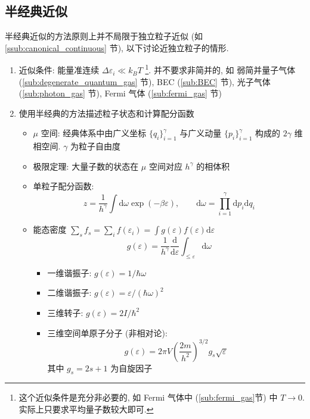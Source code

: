 \documentclass[12pt,a4paper]{article}%
\numberwithin{equation}{section}
\newcommand{\dif}{\mathrm{d}}
\begin{document}
\subsection{半经典近似} %
\label{sub:semi-classical_approx}
半经典近似的方法原则上并不局限于独立粒子近似 (如 \ref{ssub:canonical_continuous} 节), 以下讨论近独立粒子的情形.
\begin{enumerate}
    \item 近似条件: 能量准连续 $\Delta\varepsilon_i\ll k_B T$
    \footnote{这个近似条件是充分非必要的, 如 Fermi 气体中 (\ref{sub:fermi_gas}节) 中 $T\to 0$. 实际上只要求平均量子数较大即可.}. 
    并不要求非简并的, 如
    弱简并量子气体 (\ref{sub:degenerate_quantum_gas} 节), 
    BEC (\ref{sub:BEC} 节), 
    光子气体 (\ref{sub:photon_gas} 节), 
    Fermi 气体 (\ref{sub:fermi_gas} 节)
    \item 使用半经典的方法描述粒子状态和计算配分函数
    \begin{itemize}
        \item $\mu$ 空间: 经典体系中由广义坐标 $\{q_i\}_{i=1}^\gamma$ 与广义动量 $\{p_i\}_{i=1}^\gamma$ 构成的 $2\gamma$ 维相空间.
        $\gamma$ 为粒子自由度
        \item 极限定理: 大量子数的状态在 $\mu$ 空间对应 $h^\gamma$ 的相体积
        \item 单粒子配分函数: 
        \begin{equation}
            z = \frac 1{h^\gamma}\int\dif\omega\exp(-\beta\varepsilon),\qquad
            \dif\omega = \prod_{i=1}^\gamma \dif p_i\dif q_i
        \end{equation}
        \item 能态密度 $\sum_s f_s = \sum_i f(\varepsilon_i) = \int g(\varepsilon)f(\varepsilon)\dif\varepsilon$
        \begin{equation}
            g(\varepsilon) = \frac1{h^{\gamma}}\frac{\dif}{\dif\varepsilon}\int_{\le\varepsilon}\dif\omega
        \end{equation}
        \begin{itemize}
            \item 一维谐振子: $g(\varepsilon) = 1/\hbar\omega$
            \item 二维谐振子: $g(\varepsilon) = \varepsilon/(\hbar\omega)^2$
            \item 三维转子: $g(\varepsilon) = 2I/\hbar^2$
            \item 三维空间单原子分子 (非相对论): 
            \begin{equation}\label{equ:state_density_for_ideal_gas}
                g(\varepsilon) = 2\pi V\left(\frac{2m}{h^2}\right)^{3/2}g_s\sqrt\varepsilon
            \end{equation}
            其中 $g_s = 2s+1$ 为自旋因子
        \end{itemize}
    \end{itemize}
\end{enumerate}
\end{document}

